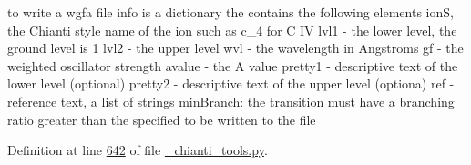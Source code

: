 \begin{DoxyVerb}to write a wgfa file
info is a dictionary the contains the following elements
ionS, the Chianti style name of the ion such as c_4 for C IV
lvl1 - the lower level, the ground level is 1
lvl2 - the upper level
wvl - the wavelength in Angstroms
gf - the weighted oscillator strength
avalue - the A value
pretty1 - descriptive text of the lower level (optional)
pretty2 - descriptive text of the upper level (optiona)
ref - reference text, a list of strings
minBranch:  the transition must have a branching ratio greater than the specified to be written to the file
\end{DoxyVerb}
 

Definition at line \hyperlink{__chianti__tools_8py_source_l00642}{642} of file \hyperlink{__chianti__tools_8py_source}{\-\_\-chianti\-\_\-tools.\-py}.


